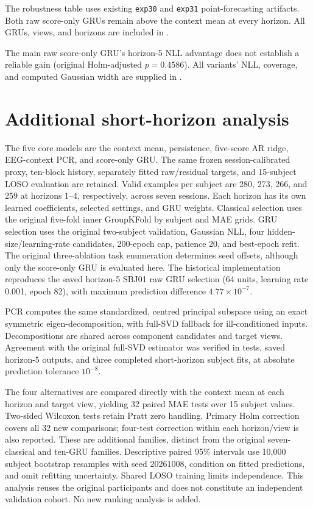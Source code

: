 \documentclass[a4paper,10pt,onecolumn]{IEEEtran}
\begin{document}


The robustness table uses existing \texttt{exp30} and \texttt{exp31}
point-forecasting artifacts. Both raw score-only GRUs remain above the
context mean at every horizon. All GRUs, views, and horizons are included
in .




The main raw score-only GRU's horizon-5 NLL advantage does not establish
a reliable gain (original Holm-adjusted $p=0.4586$).
All variants' NLL, coverage, and computed Gaussian width are supplied
in .

\clearpage
\section{Additional short-horizon analysis}

The five core models are the context mean, persistence, five-score AR ridge,
EEG-context PCR, and score-only GRU. The same frozen session-calibrated proxy,
ten-block history, separately fitted raw/residual targets, and 15-subject
LOSO evaluation are retained. Valid examples per subject are 280, 273, 266,
and 259 at horizons 1--4, respectively, across seven sessions.
Each horizon has its own learned coefficients, selected settings, and GRU weights.
Classical selection uses the original five-fold inner GroupKFold by subject
and MAE grids. GRU selection uses the original two-subject validation,
Gaussian NLL, four hidden-size/learning-rate candidates, 200-epoch cap,
patience 20, and best-epoch refit. The original three-ablation task enumeration
determines seed offsets, although only the score-only GRU is evaluated here.
The historical implementation reproduces the saved horizon-5 SBJ01 raw GRU
selection (64 units, learning rate 0.001, epoch 82), with maximum prediction
difference $4.77\times10^{-7}$.

PCR computes the same standardized, centred principal subspace using an exact
symmetric eigen-decomposition, with full-SVD fallback for ill-conditioned
inputs. Decompositions are shared across component candidates and target views.
Agreement with the original full-SVD estimator was verified in tests, saved
horizon-5 outputs, and three completed short-horizon subject fits, at absolute
prediction tolerance $10^{-8}$.

The four alternatives are compared directly with the context mean at each
horizon and target view, yielding 32 paired MAE tests over 15 subject values.
Two-sided Wilcoxon tests retain Pratt zero handling. Primary Holm correction
covers all 32 new comparisons; four-test correction within each horizon/view
is also reported. These are additional families, distinct from the original
seven-classical and ten-GRU families. Descriptive paired 95\% intervals use
10,000 subject bootstrap resamples with seed 20261008, condition on fitted
predictions, and omit refitting uncertainty. Shared LOSO training limits
independence. This analysis reuses the original participants and does not
constitute an independent validation cohort. No new ranking analysis is added.
\end{document}
